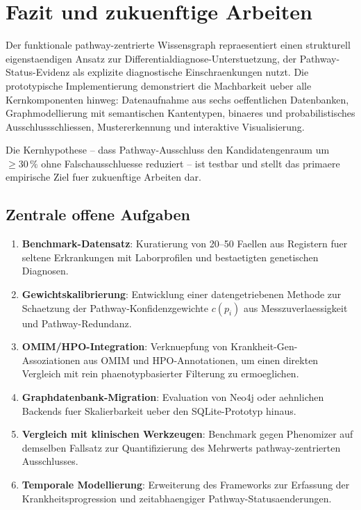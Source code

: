 \documentclass[12pt,a4paper]{article}
\begin{document}
\section*{Fazit und zukuenftige Arbeiten}
\label{de:sec:conclusion}

Der funktionale pathway-zentrierte Wissensgraph repraesentiert einen strukturell eigenstaendigen Ansatz zur Differentialdiagnose-Unterstuetzung, der Pathway-Status-Evidenz als explizite diagnostische Einschraenkungen nutzt. Die prototypische Implementierung demonstriert die Machbarkeit ueber alle Kernkomponenten hinweg: Datenaufnahme aus sechs oeffentlichen Datenbanken, Graphmodellierung mit semantischen Kantentypen, binaeres und probabilistisches Ausschlussschliessen, Mustererkennung und interaktive Visualisierung.

Die Kernhypothese -- dass Pathway-Ausschluss den Kandidatengenraum um $\geq 30\,\%$ ohne Falschausschluesse reduziert -- ist testbar und stellt das primaere empirische Ziel fuer zukuenftige Arbeiten dar.

\subsection*{Zentrale offene Aufgaben}

\begin{enumerate}
    \item \textbf{Benchmark-Datensatz}: Kuratierung von 20--50 Faellen aus Registern fuer seltene Erkrankungen mit Laborprofilen und bestaetigten genetischen Diagnosen.
    \item \textbf{Gewichtskalibrierung}: Entwicklung einer datengetriebenen Methode zur Schaetzung der Pathway-Konfidenzgewichte $c(p_i)$ aus Messzuverlaessigkeit und Pathway-Redundanz.
    \item \textbf{OMIM/HPO-Integration}: Verknuepfung von Krankheit-Gen-Assoziationen aus OMIM und HPO-Annotationen, um einen direkten Vergleich mit rein phaenotypbasierter Filterung zu ermoeglichen.
    \item \textbf{Graphdatenbank-Migration}: Evaluation von Neo4j oder aehnlichen Backends fuer Skalierbarkeit ueber den SQLite-Prototyp hinaus.
    \item \textbf{Vergleich mit klinischen Werkzeugen}: Benchmark gegen Phenomizer auf demselben Fallsatz zur Quantifizierung des Mehrwerts pathway-zentrierten Ausschlusses.
    \item \textbf{Temporale Modellierung}: Erweiterung des Frameworks zur Erfassung der Krankheitsprogression und zeitabhaengiger Pathway-Statusaenderungen.
\end{enumerate}
\end{document}
